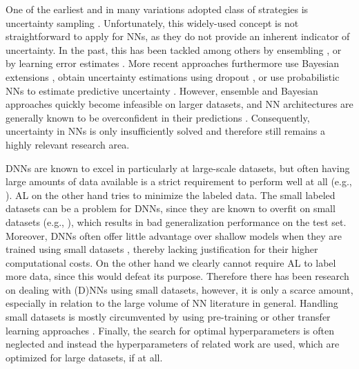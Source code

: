 One of the earliest and in many variations adopted class of strategies is uncertainty sampling .
\label{sect:nn_uncertainty}
Unfortunately, this widely-used concept is not straightforward to apply for NNs, as they do not provide an inherent indicator of uncertainty.
In the past, this has been tackled among others by ensembling , or by learning error estimates .
More recent approaches furthermore use Bayesian extensions , 
obtain uncertainty estimations using dropout ,
or use probabilistic NNs to estimate predictive uncertainty .
However, ensemble and Bayesian approaches quickly become infeasible on larger datasets,
and NN architectures are generally known to be overconfident in their predictions .
Consequently, uncertainty in NNs is only insufficiently solved and therefore still remains a highly relevant research area.

DNNs are known to excel in particularly at large-scale datasets,
but often having large amounts of data available is a strict requirement to perform well at all (e.g., ).
AL on the other hand tries to minimize the labeled data.
The small labeled datasets can be a problem for DNNs, since they are known to overfit on small datasets (e.g., ), 
which results in bad generalization performance on the test set.
Moreover, DNNs often offer little advantage over shallow models when they are trained using small datasets , thereby lacking justification for their higher computational costs.
On the other hand we clearly cannot require AL to label more data, since this would defeat its purpose.
Therefore there has been research on dealing with (D)NNs using small datasets, however, it is only a scarce amount, especially in relation to the large volume of NN literature in general.
Handling small datasets is mostly circumvented by using pre-training  or other transfer learning approaches .
Finally, the search for optimal hyperparameters is often neglected and instead the hyperparameters of related work are used, which are optimized for large datasets, if at all.

